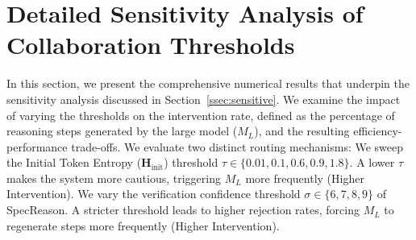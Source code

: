\documentclass[11pt]{article}
\newcommand{\zeng}[1]{\textcolor[rgb]{1,0.66,0}{\textbf{[Zeng: #1]}}}
\newcommand{\approach}{{GlimpRouter}\xspace}
\begin{document}









\section{Detailed Sensitivity Analysis of Collaboration Thresholds}
\label{app:sensitivity}

In this section, we present the comprehensive numerical results that underpin the sensitivity analysis discussed in Section~\ref{ssec:sensitive}. We examine the impact of varying the thresholds on the intervention rate, defined as the percentage of reasoning steps generated by the large model ($M_L$), and the resulting efficiency-performance trade-offs.
We evaluate two distinct routing mechanisms: 
We sweep the Initial Token Entropy ($\mathbf{H}_\text{init}$) threshold $\tau \in \{0.01, 0.1, 0.6, 0.9, 1.8\}$. A lower $\tau$ makes the system more cautious, triggering $M_L$ more frequently (Higher Intervention).
We vary the verification confidence threshold $\sigma \in \{6, 7, 8, 9\}$ of SpecReason. A stricter threshold leads to higher rejection rates, forcing $M_L$ to regenerate steps more frequently (Higher Intervention).
\end{document}
